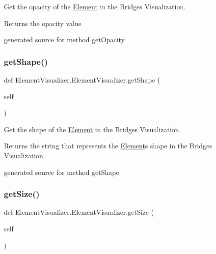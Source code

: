Get the opacity of the \hyperlink{namespace_element}{Element} in the Bridges Visualization. 

\begin{DoxyReturn}{Returns}
the opacity value\begin{DoxyVerb}generated source for method getOpacity \end{DoxyVerb}
 
\end{DoxyReturn}
\hypertarget{class_element_visualizer_1_1_element_visualizer_a5a995818bc21ffba6bcab3c34220cf80}{}\label{class_element_visualizer_1_1_element_visualizer_a5a995818bc21ffba6bcab3c34220cf80} 
\subsubsection{\texorpdfstring{get\+Shape()}{getShape()}}
{\footnotesize\ttfamily def Element\+Visualizer.\+Element\+Visualizer.\+get\+Shape (\begin{DoxyParamCaption}\item[{}]{self }\end{DoxyParamCaption})}



Get the shape of the \hyperlink{namespace_element}{Element} in the Bridges Visualization. 

\begin{DoxyReturn}{Returns}
the string that represents the \hyperlink{namespace_element}{Element}\textquotesingle{}s shape in the Bridges Visualization.\begin{DoxyVerb}generated source for method getShape \end{DoxyVerb}
 
\end{DoxyReturn}
\hypertarget{class_element_visualizer_1_1_element_visualizer_a6021f693ae84d46c5e5d8fc27873ca7e}{}\label{class_element_visualizer_1_1_element_visualizer_a6021f693ae84d46c5e5d8fc27873ca7e} 
\subsubsection{\texorpdfstring{get\+Size()}{getSize()}}
{\footnotesize\ttfamily def Element\+Visualizer.\+Element\+Visualizer.\+get\+Size (\begin{DoxyParamCaption}\item[{}]{self }\end{DoxyParamCaption})}



